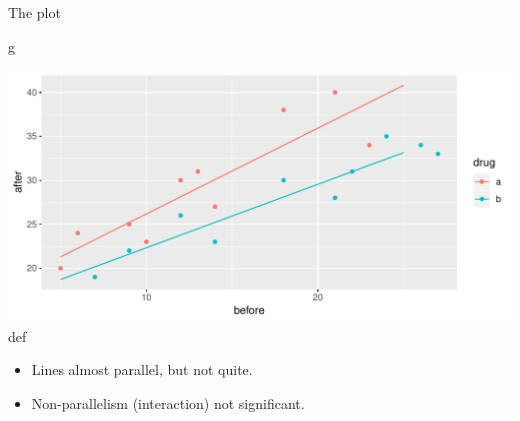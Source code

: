\documentclass[ignorenonframetext,]{beamer}
\newenvironment{Shaded}{\begin{snugshade}}{\end{snugshade}}
\newcommand{\NormalTok}[1]{#1}
\begin{document}
\begin{frame}[fragile]{The plot}
\protect\hypertarget{the-plot-6}{}

\begin{Shaded}
\begin{Highlighting}[]
\NormalTok{g}
\end{Highlighting}
\end{Shaded}

\includegraphics{figure/nachwazzo-1.pdf} def

\begin{itemize}
\item
  Lines almost parallel, but not quite.
\item
  Non-parallelism (interaction) not significant.
\end{itemize}

\end{frame}
\end{document}
